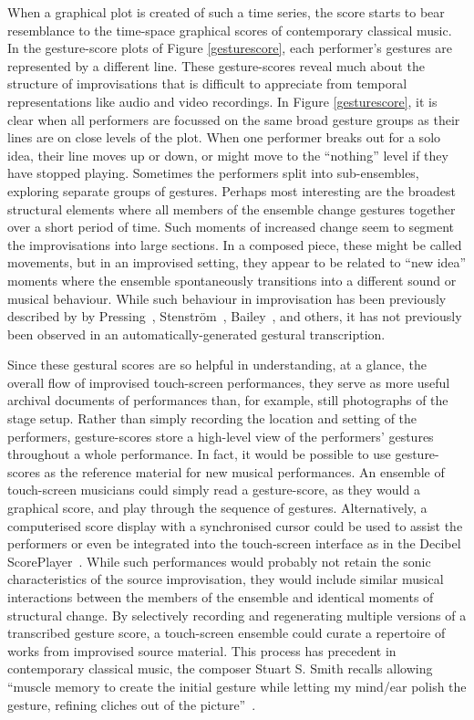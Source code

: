 \documentclass[graybox]{svmult}
\begin{document}
When a graphical plot is created of such a time series, the score
starts to bear resemblance to the time-space graphical scores of
contemporary classical music. In the gesture-score plots of Figure
\ref{gesturescore}, each performer's gestures are represented by a
different line. These gesture-scores reveal much about the
structure of improvisations that is difficult to appreciate from
temporal representations like audio and video recordings. In Figure
\ref{gesturescore}, it is clear when all performers are focussed on
the same broad gesture groups as their lines are on close levels of
the plot. When one performer breaks out for a solo idea, their line
moves up or down, or might move to the ``nothing'' level if they 
have stopped playing. Sometimes the performers split into
sub-ensembles, exploring separate groups of gestures. Perhaps most
interesting are the broadest structural elements where all members of
the ensemble change gestures together over a short period of time.
Such moments of increased change seem to segment the improvisations
into large sections. In a composed piece, these might be called
movements, but in an improvised setting, they appear to be related to
``new idea'' moments where the ensemble spontaneously transitions into
a different sound or musical behaviour. While such behaviour in
improvisation has been previously described by by
Pressing~\cite{Pressing:1988uo}, Stenstr\"om~\cite{Stenstrom:2009xy},
Bailey~\cite{Bailey:1993zl}, and others, it has not previously been
observed in an automatically-generated gestural transcription.

Since these gestural scores are so helpful in understanding, at a
glance, the overall flow of improvised touch-screen performances, they
serve as more useful archival documents of performances than, for
example, still photographs of the stage setup. Rather than simply
recording the location and setting of the performers, gesture-scores
store a high-level view of the performers' gestures throughout a whole
performance. In fact, it would be possible to use gesture-scores as
the reference material for new musical performances. An ensemble of
touch-screen musicians could simply read a gesture-score, as they
would a graphical score, and play through the sequence of gestures.
Alternatively, a computerised score display with a synchronised cursor
could be used to assist the performers or even be integrated into the
touch-screen interface as in the Decibel
ScorePlayer~\cite{Hope:2015lr}. While such performances would probably
not retain the sonic characteristics of the source improvisation, they
would include similar musical interactions between the members of the
ensemble and identical moments of structural change. By selectively
recording and regenerating multiple versions of a transcribed gesture
score, a touch-screen ensemble could curate a repertoire of works from
improvised source material. This process has precedent in contemporary
classical music, the composer Stuart S. Smith recalls allowing
``muscle memory to create the initial gesture while letting my
mind/ear polish the gesture, refining cliches out of the
picture''~\cite{Smith:1998ff}.
\end{document}
